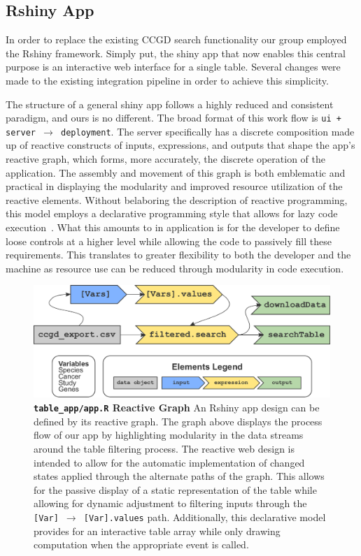\documentclass[10pt]{report}
\begin{document}
\subsection{Rshiny App}
In order to replace the existing CCGD search functionality our group employed the Rshiny framework. Simply put, the shiny app that now enables this central purpose is an interactive web interface for a single table. Several changes were made to the existing integration pipeline in order to achieve this simplicity.

The structure of a general shiny app follows a highly reduced and consistent paradigm, and ours is no different. The broad format of this work flow is \texttt{ui + server $\rightarrow$ deployment}. The server specifically has a discrete composition made up of reactive constructs of inputs, expressions, and outputs that shape the app's reactive graph, which forms, more accurately, the discrete operation of the application. The assembly and movement of this graph is both emblematic and practical in displaying the modularity and improved resource utilization of the reactive elements. Without belaboring the description of reactive programming, this model employs a declarative programming style that allows for lazy code execution~\cite{wickhamMasteringShinyBook}. What this amounts to in application is for the developer to define loose controls at a higher level while allowing the code to passively fill these requirements. This translates to greater flexibility to both the developer and the machine as resource use can be reduced through modularity in code execution.

\begin{figure}[H]
    \centering
    \includegraphics[width=\textwidth]{fig/reactive_graph.pdf}
    \caption[\texttt{table\_app/app.R} Reactive Graph]{\textbf{\texttt{table\_app/app.R} Reactive Graph} An Rshiny app design can be defined by its reactive graph. The graph above displays the process flow of our app by highlighting modularity in the data streams around the table filtering process. The reactive web design is intended to allow for the automatic implementation of changed states applied through the alternate paths of the graph. This allows for the passive display of a static representation of the table while allowing for dynamic adjustment to filtering inputs through the \texttt{[Var] $\rightarrow$ [Var].values} path. Additionally, this declarative model provides for an interactive table array while only drawing computation when the appropriate event is called.}\label{fig:reactiveGraph}
\end{figure}
\end{document}
